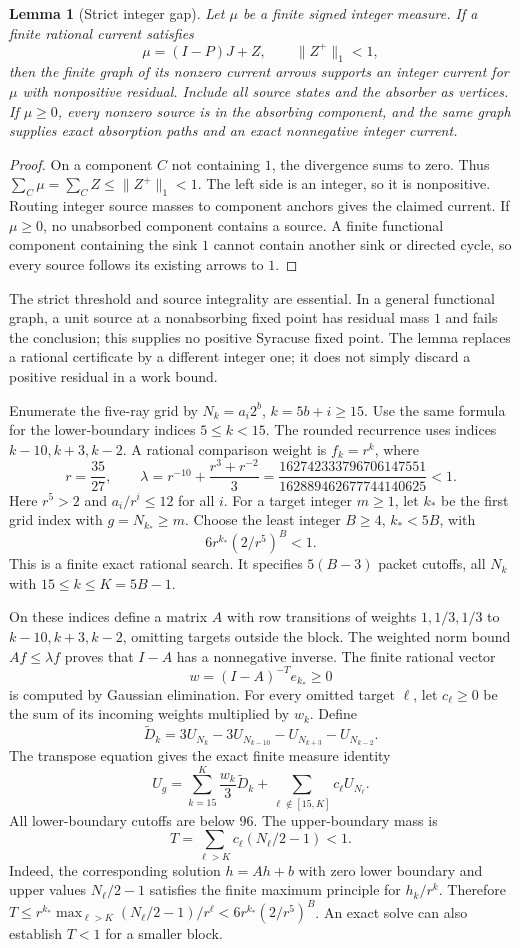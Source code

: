 \documentclass[11pt]{article}
\newtheorem{lemma}[theorem]{Lemma}
\begin{document}
\begin{lemma}[Strict integer gap]\label{lem:integergap}
Let $\mu$ be a finite signed integer measure. If a finite rational current
satisfies
\[
\mu=(I-P)J+Z,\qquad \|Z^+\|_1<1,
\]
then the finite graph of its nonzero current arrows supports an integer
current for $\mu$ with nonpositive residual. Include all source states
and the absorber as vertices. If $\mu\ge0$, every nonzero source is in
the absorbing component, and the same graph supplies exact absorption
paths and an exact nonnegative integer current.
\end{lemma}
\begin{proof}
On a component $C$ not containing $1$, the divergence sums to zero.
Thus $\sum_C\mu=\sum_C Z\le\|Z^+\|_1<1$. The left side is an integer,
so it is nonpositive. Routing integer source masses to component anchors
gives the claimed current. If $\mu\ge0$, no unabsorbed component contains
a source. A finite functional component containing the sink $1$ cannot
contain another sink or directed cycle, so every source follows its
existing arrows to $1$.
\end{proof}
The strict threshold and source integrality are essential. In a general
functional graph, a unit source at a nonabsorbing fixed point has residual
mass $1$ and fails the conclusion; this supplies no positive Syracuse
fixed point. The lemma replaces a rational certificate by a different
integer one; it does not simply discard a positive residual in a work bound.

Enumerate the five-ray grid by $N_k=a_i2^b$, $k=5b+i\ge15$.
Use the same formula for the lower-boundary indices $5\le k<15$.
The rounded recurrence uses indices $k-10,k+3,k-2$. A rational comparison
weight is $f_k=r^k$, where
\[
r=\frac{35}{27},\qquad
\lambda=r^{-10}+\frac{r^3+r^{-2}}3
=\frac{162742333796706147551}{162889462677744140625}<1.
\]
Here $r^5>2$ and $a_i/r^i\le12$ for all $i$.
For a target integer $m\ge1$, let $k_*$ be the first grid index with
$g=N_{k_*}\ge m$. Choose the least integer $B\ge4$, $k_*<5B$, with
\[
6r^{k_*}(2/r^5)^B<1.
\]
This is a finite exact rational search. It specifies $5(B-3)$ packet
cutoffs, all $N_k$ with $15\le k\le K=5B-1$.

On these indices define a matrix $A$ with row transitions of weights
$1,1/3,1/3$ to $k-10,k+3,k-2$, omitting targets outside the block.
The weighted norm bound $Af\le\lambda f$ proves that $I-A$ has a
nonnegative inverse. The finite rational vector
\[
w=(I-A)^{-T}e_{k_*}\ge0
\]
is computed by Gaussian elimination. For every omitted target $\ell$,
let $c_\ell\ge0$ be the sum of its incoming weights multiplied by $w_k$.
Define
\[
\widetilde D_k=3U_{N_k}-3U_{N_{k-10}}-U_{N_{k+3}}-U_{N_{k-2}}.
\]
The transpose equation gives the exact finite measure identity
\[
U_g=\sum_{k=15}^{K}\frac{w_k}{3}\widetilde D_k
       +\sum_{\ell\notin[15,K]}c_\ell U_{N_\ell}.
\]
All lower-boundary cutoffs are below $96$. The upper-boundary mass is
\[
T=\sum_{\ell>K}c_\ell(N_\ell/2-1)<1.
\]
Indeed, the corresponding solution $h=Ah+b$ with zero lower boundary
and upper values $N_\ell/2-1$ satisfies the finite maximum principle for
$h_k/r^k$. Therefore
$T\le r^{k_*}\max_{\ell>K}(N_\ell/2-1)/r^\ell
<6r^{k_*}(2/r^5)^B$.
An exact solve can also establish $T<1$ for a smaller block.
\end{document}
